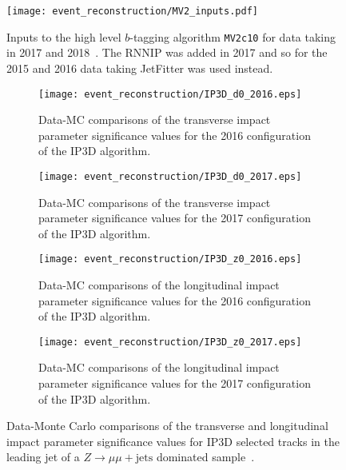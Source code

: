 \begin{figure}[htbp]
 \centering
 \centering
 \texttt{[image: event\_reconstruction/MV2\_inputs.pdf]}
 \caption[Inputs to the high level $b$-tagging algorithm \texttt{MV2c10} for data taking in 2017 and 2018.]{%
  Inputs to the high level $b$-tagging algorithm \texttt{MV2c10} for data taking in 2017 and 2018~\cite{Feickert:ML4Jets2018}.
  The RNNIP was added in 2017 and so for the 2015 and 2016 data taking JetFitter was used instead.}
 \label{fig:MV2_inputs}
\end{figure}

\begin{figure}[htbp]
 \centering
 \begin{subfigure}[t]{0.48\textwidth}
  \centering
  \texttt{[image: event\_reconstruction/IP3D\_d0\_2016.eps]}
  \caption[Transverse impact parameter significance values for the 2016 configuration of the IP3D algorithm.]{%
   Data-MC comparisons of the transverse impact parameter significance values for the 2016 configuration of the IP3D algorithm.}
  \label{fig:IP3D_d0_2016}
 \end{subfigure}%
 \quad
 \begin{subfigure}[t]{0.48\textwidth}
  \centering
  \texttt{[image: event\_reconstruction/IP3D\_d0\_2017.eps]}
  \caption[Transverse impact parameter significance values for the 2017 configuration of the IP3D algorithm.]{%
   Data-MC comparisons of the transverse impact parameter significance values for the 2017 configuration of the IP3D algorithm.}
  \label{fig:IP3D_d0_2017}
 \end{subfigure}%

 \begin{subfigure}[t]{0.48\textwidth}
  \centering
  \texttt{[image: event\_reconstruction/IP3D\_z0\_2016.eps]}
  \caption[Longitudinal impact parameter significance values for the 2016 configuration of the IP3D algorithm.]{%
   Data-MC comparisons of the longitudinal impact parameter significance values for the 2016 configuration of the IP3D algorithm.}
  \label{fig:IP3D_z0_2016}
 \end{subfigure}%
 \quad
 \begin{subfigure}[t]{0.48\textwidth}
  \centering
  \texttt{[image: event\_reconstruction/IP3D\_z0\_2017.eps]}
  \caption[Longitudinal impact parameter significance values for the 2017 configuration of the IP3D algorithm.]{%
   Data-MC comparisons of the longitudinal impact parameter significance values for the 2017 configuration of the IP3D algorithm.}
  \label{fig:IP3D_z0_2017}
 \end{subfigure}%
 \caption[Data-Monte Carlo comparisons of the transverse and longitudinal impact parameter significance values for IP3D selected tracks in the leading jet of the $Z\to\mu\mu + \textrm{jets}$ dominated sample.]{%
  Data-Monte Carlo comparisons of the transverse and longitudinal impact parameter significance values for IP3D selected tracks in the leading jet of a $Z\to\mu\mu + \textrm{jets}$ dominated sample~\cite{ATL-PHYS-PUB-2017-013}.}
 \label{fig:signed_impact_parameters}
\end{figure}

